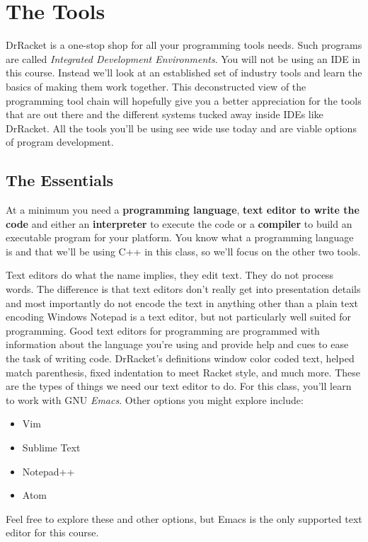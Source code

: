 \documentclass[]{tufte-handout}
\begin{document}
\section{The Tools}

DrRacket is a one-stop shop for all your programming tools needs.  Such programs are called \textit{Integrated Development Environments}. You will not be using an IDE in this course.  Instead we'll look at an established set of industry tools and learn the basics of making them work together.  This deconstructed view of the programming tool chain will hopefully give you a better appreciation for the tools that are out there and the different systems tucked away inside IDEs like DrRacket.  All the tools you'll be using see wide use today and are viable options of program development.  

\subsection{The Essentials}

At a minimum you need a \textbf{programming language}, \textbf{text editor to write the code} and either an \textbf{interpreter} to execute the code or a \textbf{compiler} to build an executable program for your platform. You know what a programming language is and that we'll be using C++ in this class, so we'll focus on the other two tools.

Text editors do what the name implies, they edit text. They do not process words. The difference is that text editors don't really get into presentation details and most importantly do not encode the text in anything other than a plain text encoding  Windows Notepad is a text editor, but not particularly well suited for programming. Good text editors for programming are programmed with information about the language you're using and provide help and cues to ease the task of writing code.  DrRacket's definitions window color coded text, helped match parenthesis, fixed indentation to meet Racket style, and much more.  These are the types of things we need our text editor to do. For this class, you'll learn to work with GNU \textit{Emacs}. Other options you might explore include:
\begin{itemize}
\item Vim
\item Sublime Text
\item Notepad++
\item Atom 
\end{itemize}
Feel free to explore these and other options, but Emacs is the only supported text editor for this course.
\end{document}
